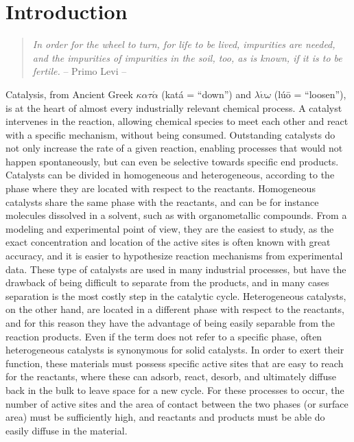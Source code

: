 \graphicspath{{figures/chapter1/}}
\renewcommand\evenpagerightmark{{\scshape\small Introduction}}
\renewcommand\oddpageleftmark{{\scshape\small Chapter 1}}


\hyphenation{}

\chapter[Introduction]%
{Introduction}
\label{ch1}

\begin{flushright}
\begin{quotation}
\textit{In order for the wheel to turn, for life to be lived, impurities are needed, and the impurities of impurities in the soil, too, as is known, if it is to be fertile.} -- Primo Levi --
\end{quotation}
\end{flushright}
\npar
Catalysis, from Ancient Greek $\kappa\alpha\tau\acute{\alpha}$ (kat\'a = ``down'') and $\lambda\acute{\upsilon}\omega$ (l\'u\=o = ``loosen''), is at the heart of almost every industrially relevant chemical process. A catalyst intervenes in the reaction, allowing chemical species to meet each other and react with a specific mechanism, without being consumed. 
Outstanding catalysts do not only increase the rate of a given reaction, enabling processes that would not happen spontaneously, but can even be selective towards specific end products. Catalysts can be divided in homogeneous and heterogeneous, according to the phase where they are located with respect to the reactants. Homogeneous catalysts share the same phase with the reactants, and can be for instance molecules dissolved in a solvent, such as with organometallic compounds. From a modeling and experimental point of view, they are the easiest to study, as the exact concentration and location of the active sites is often known with great accuracy, and it is easier to hypothesize reaction mechanisms from experimental data. These type of catalysts are used in many industrial processes, but have the drawback of being difficult to separate from the products, and in many cases separation is the most costly step in the catalytic cycle.
\npar
Heterogeneous catalysts, on the other hand, are located in a different phase with respect to the reactants, and for this reason they have the advantage of being easily separable from the reaction products. Even if the term does not refer to a specific phase, often heterogeneous catalysts is synonymous for solid catalysts. In order to exert their function, these materials must possess specific active sites that are easy to reach for the reactants, where these can adsorb, react, desorb, and ultimately diffuse back in the bulk to leave space for a new cycle. For these processes to occur, the number of active sites and the area of contact between the two phases (or surface area) must be sufficiently high, and reactants and products must be able do easily diffuse in the material. 

